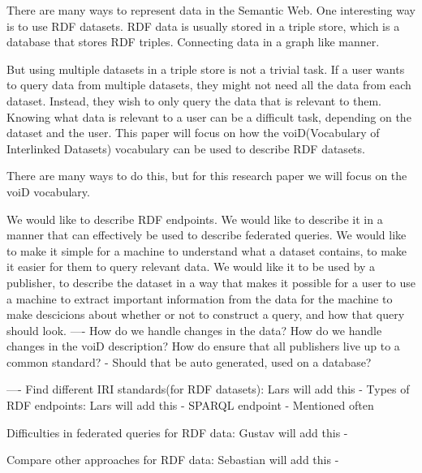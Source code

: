 There are many ways to represent data in the Semantic Web. One interesting way is to use RDF datasets. RDF data is usually stored in a triple store, which is a database that stores RDF triples. Connecting data in a graph like manner. 


But using multiple datasets in a triple store is not a trivial task. If a user wants to query data from multiple datasets, they might not need all the data from each dataset. Instead, they wish to only query the data that is relevant to them. Knowing what data is relevant to a user can be a difficult task, depending on the dataset and the user.
This paper will focus on how the voiD(Vocabulary of Interlinked Datasets) vocabulary can be used to describe RDF datasets. 


There are many ways to do this, but for this research paper we will focus on the voiD vocabulary.


We would like to describe RDF endpoints.
We would like to describe it in a manner that can effectively be used to describe federated queries.
We would like to make it simple for a machine to understand what a dataset contains, to make it easier for them to query relevant data.
We would like it to be used by a publisher, to describe the dataset in a way that makes it possible for a user to use a machine to extract important information from the data for the machine to make descicions about whether or not to construct a query, and how that query should look.    
----
How do we handle changes in the data? How do we handle changes in the voiD description?
How do ensure that all publishers live up to a common standard?
    - Should that be auto generated, used on a database?


----    
Find different IRI standards(for RDF datasets): Lars will add this
    -
Types of RDF endpoints: Lars will add this
    - SPARQL endpoint
        - Mentioned often

Difficulties in federated queries for RDF data: Gustav will add this
    - 

Compare other approaches for RDF data: Sebastian will add this
    - 




